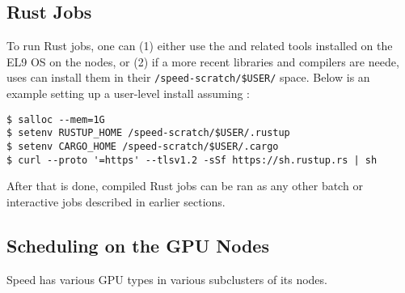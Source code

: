 
\subsection{Rust Jobs}
\label{sect:rust}

To run Rust jobs, one can (1) either use the  and
related tools installed on the EL9 OS on the nodes, or (2) if
a more recent libraries and compilers are neede, uses
can install them in their \texttt{/speed-scratch/\$USER/}
space. Below is an example setting up a user-level
install assuming :

\scriptsize
\begin{verbatim}
$ salloc --mem=1G
$ setenv RUSTUP_HOME /speed-scratch/$USER/.rustup
$ setenv CARGO_HOME /speed-scratch/$USER/.cargo
$ curl --proto '=https' --tlsv1.2 -sSf https://sh.rustup.rs | sh
\end{verbatim}
\normalsize

After that is done, compiled Rust jobs can be ran as any other
batch or interactive jobs described in earlier sections.

\subsection{Scheduling on the GPU Nodes}
\label{sect:gpu-scheduling}

Speed has various GPU types in various subclusters of its nodes.

